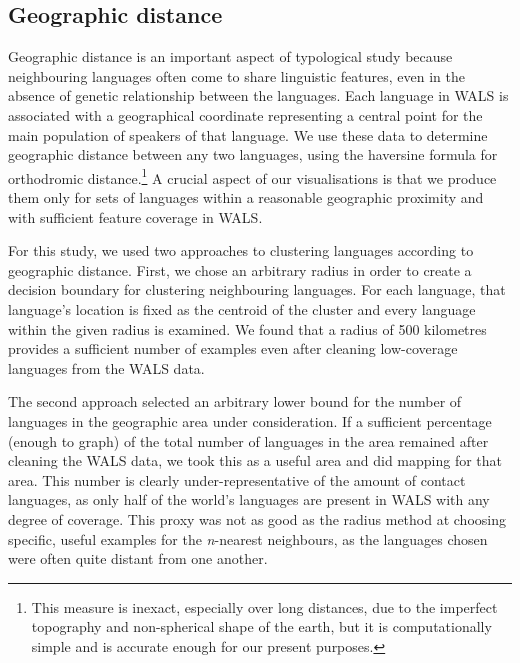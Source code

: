 \documentclass[11pt]{article}
\begin{document}
\subsection{Geographic distance}
Geographic distance is an important aspect of typological study because neighbouring  languages often come to share linguistic features, even in the absence of genetic relationship between the languages. Each language in WALS is associated with a geographical coordinate representing a central point for the main population of speakers of that language. We use these data to determine geographic distance between any two languages, using the haversine formula for orthodromic distance.\footnote{This measure is inexact, especially over long distances, due to the imperfect topography and non-spherical shape of the earth, but it is computationally simple and is accurate enough for our present purposes.}
A crucial aspect of our visualisations is that we produce them only for sets of languages within a reasonable geographic proximity and with sufficient feature coverage in WALS.

For this study, we used two approaches to clustering languages according to geographic distance. First, we chose an arbitrary radius in order to create a decision boundary for clustering neighbouring languages. For each language, that language's location is fixed as the centroid of the cluster and every language within the given radius is examined. We found that a radius of 500 kilometres provides a sufficient number of examples even after cleaning low-coverage languages from the WALS data. 

The second approach selected an arbitrary lower bound for the number of languages in the geographic area under consideration. If a sufficient percentage (enough to graph) of the total number of languages in the area remained after cleaning the WALS data, we took this as a useful area and did mapping for that area. This number is clearly under-representative of the amount of contact languages, as only half of the world's languages are present in WALS with any degree of coverage. This proxy was not as good as the radius method at choosing specific, useful examples for the \emph{n}-nearest neighbours, as the languages chosen were often quite distant from one another. 
\end{document}
